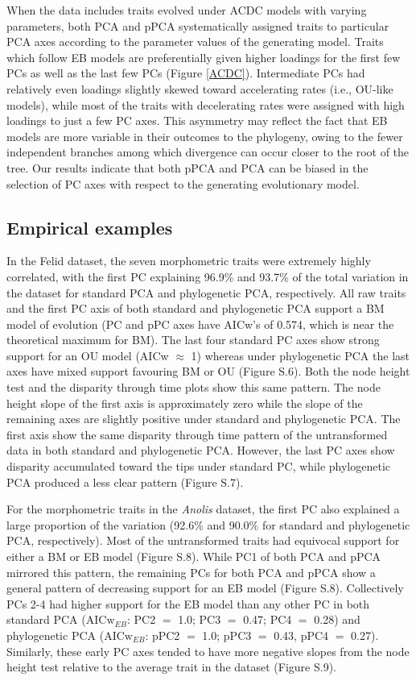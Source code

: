 \documentclass[a4paper,11pt]{article}
\begin{document}
When the data includes traits evolved under ACDC models with varying parameters, both PCA and pPCA systematically assigned traits to particular PCA axes according to the parameter values of the generating model. Traits which follow EB models are preferentially given higher loadings for the first few PCs as well as the last few PCs (Figure \ref{ACDC}). Intermediate PCs had relatively even loadings slightly skewed toward accelerating rates (i.e., OU-like models), while most of the traits with decelerating rates were assigned with high loadings to just a few PC axes. This asymmetry may reflect the fact that EB models are more variable in their outcomes to the phylogeny, owing to the fewer independent branches among which divergence can occur closer to the root of the tree. Our results indicate that both pPCA and PCA can be biased in the selection of PC axes with respect to the generating evolutionary model.

\subsection{Empirical examples}
In the Felid dataset, the seven morphometric traits were extremely highly correlated, with the first PC explaining 96.9\% and 93.7\% of the total variation in the dataset for standard PCA and phylogenetic PCA, respectively. All raw traits and the first PC axis of both standard and phylogenetic PCA support a BM model of evolution (PC and pPC axes have AICw's of 0.574, which is near the theoretical maximum for BM). The last four standard PC axes show strong support for an OU model (AICw $\approx$ 1) whereas under phylogenetic PCA the last axes have mixed support favouring BM or OU (Figure S.6). Both the node height test and the disparity through time plots show this same pattern. The node height slope of the first axis is approximately zero while the slope of the remaining axes are slightly positive under standard and phylogenetic PCA. The first axis show the same disparity through time pattern of the untransformed data in both standard and phylogenetic PCA. However, the last PC axes show disparity accumulated toward the tips under standard PC, while phylogenetic PCA produced a less clear pattern (Figure S.7).

For the morphometric traits in the \textit{Anolis} dataset, the first PC also explained a large proportion of the variation (92.6\% and 90.0\% for standard and phylogenetic PCA, respectively). Most of the untransformed traits had equivocal support for either a BM or EB model (Figure S.8). While PC1 of both PCA and pPCA mirrored this pattern, the remaining PCs for both PCA and pPCA show a general pattern of decreasing support for an EB model (Figure S.8). Collectively PCs 2-4 had higher support for the EB model than any other PC in both standard PCA ($\text{AICw}_{EB}$: PC2 $=$ 1.0; PC3 $=$ 0.47; PC4 $=$ 0.28) and phylogenetic PCA ($\text{AICw}_{EB}$: pPC2 $=$ 1.0; pPC3 $=$ 0.43, pPC4 $=$ 0.27).  Similarly, these early PC axes tended to have more negative slopes from the node height test relative to the average trait in the dataset (Figure S.9).
\end{document}
